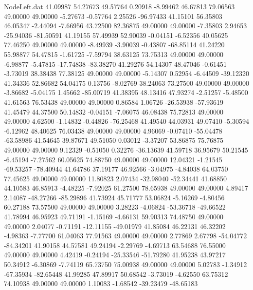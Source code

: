 \begin{filecontents}{NodeLeft.dat}
  41.09987   54.27673   49.57764     0.20918   -8.99462   46.67813   79.06563   49.00000   49.00000   -5.27673   -0.57764    2.25526  -96.97433
  41.15101   56.35803   46.05347    -2.44094   -7.66956   43.72500   82.36875   49.00000   49.00000   -7.35803    2.94653  -25.94036  -81.50591
  41.19155   57.49939   52.90039    -0.04151   -6.52356   40.05625   77.46250   49.00000   49.00000   -8.49939   -3.90039   -0.43807  -68.85114
  41.24220   55.98877   54.47815    -1.61725   -7.59794   38.63125   73.75313   49.00000   49.00000   -6.98877   -5.47815  -17.74838  -83.38270
  41.29276   54.14307   48.47046    -0.61451   -3.73019   38.38438   77.38125   49.00000   49.00000   -5.14307    0.52954   -6.44509  -39.12320
  41.34336   52.86682   54.04175     0.13756   -8.02769   38.24063   73.27500   49.00000   49.00000   -3.86682   -5.04175    1.45662  -85.00719
  41.38395   48.13416   47.93274    -2.51257   -5.48500   41.61563   76.53438   49.00000   49.00000    0.86584    1.06726  -26.53938  -57.93619
  41.45479   44.37500   50.14832    -0.04151   -7.06075   46.08438   75.72813   49.00000   49.00000    4.62500   -1.14832   -0.44826  -76.25468
  41.49540   44.03931   49.07410    -5.30594   -6.12962   48.40625   76.03438   49.00000   49.00000    4.96069   -0.07410  -55.04478  -63.58986
  41.54645   39.87671   49.51050     0.03012   -3.37207   53.86875   75.76875   49.00000   49.00000    9.12329   -0.51050    0.32276  -36.13639
  41.59718   36.95679   50.21545    -6.45194   -7.27562   60.05625   74.88750   49.00000   49.00000   12.04321   -1.21545  -69.53257  -78.40944
  41.64786   37.19177   46.92566    -3.04975   -4.84038   64.03750   77.45625   49.00000   49.00000   11.80823    2.07434  -32.98040  -52.34441
  41.68850   44.10583   46.85913    -4.48225   -7.92025   61.27500   78.65938   49.00000   49.00000    4.89417    2.14087  -48.27266  -85.29896
  41.73924   45.71777   53.06824    -5.16269   -4.80456   60.27188   73.57500   49.00000   49.00000    3.28223   -4.06824  -53.36718  -49.66522
  41.78994   46.95923   49.71191    -1.15169   -4.66131   59.90313   74.48750   49.00000   49.00000    2.04077   -0.71191  -12.11155  -49.01979
  41.85084   46.22131   46.32202    -4.98363   -7.77700   61.04063   77.91563   49.00000   49.00000    2.77869    2.67798  -54.04772  -84.34201
  41.90158   44.57581   49.24194    -2.29769   -4.69713   63.54688   76.55000   49.00000   49.00000    4.42419   -0.24194  -25.33546  -51.79280
  41.95238   43.97217   50.34912    -6.30869   -7.74119   65.73750   75.00938   49.00000   49.00000    5.02783   -1.34912  -67.35934  -82.65448
  41.99285   47.89917   50.68542    -3.73019   -4.62550   63.75312   74.10938   49.00000   49.00000    1.10083   -1.68542  -39.23479  -48.65183

\end{filecontents}
